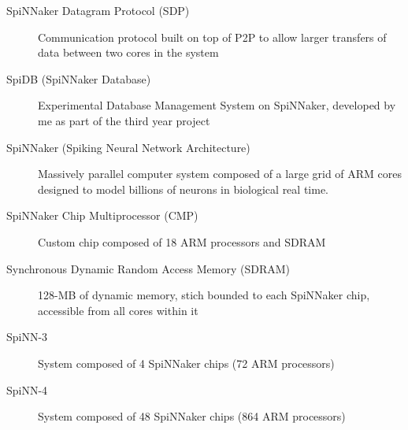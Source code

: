 \begin{description}
  \item[SpiNNaker Datagram Protocol (SDP)] Communication protocol built on top of P2P to allow larger transfers of data between two cores in the system  
    
  \item[SpiDB (SpiNNaker Database)] Experimental Database Management System on SpiNNaker, developed by me as part of the third year project
  
  \item[SpiNNaker (Spiking Neural Network Architecture)] Massively parallel computer system composed of a large grid of ARM cores designed to model billions of neurons in biological real time.\cite{painkras}
  
  \item[SpiNNaker Chip Multiprocessor (CMP)] Custom chip composed of 18 ARM processors and SDRAM  
  
  \item[Synchronous Dynamic Random Access Memory (SDRAM)] 128-MB of dynamic memory, stich bounded to each SpiNNaker chip, accessible from all cores within it
  
  \item[SpiNN-3] System composed of 4 SpiNNaker chips (72 ARM processors)
  \item[SpiNN-4] System composed of 48 SpiNNaker chips (864 ARM processors)  

\end{description}
